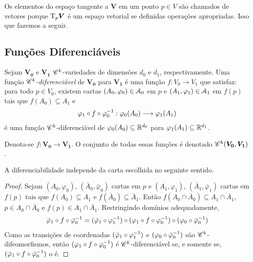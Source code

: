 Os elementos do espaço tangente a $\bm V$ em um ponto $p \in V$ são chamados de vetores porque $\mathrm{T}_p \bm V$ é um espaço vetorial se definidas operações apropriadas. Isso que fazemos a seguir.

\subsection{Funções Diferenciáveis}

\begin{defi}
Sejam $\bm{V_0}$ e $\bm{V_1}$ $\mathscr{C}^k$-variedades de dimensões $d_0$ e $d_1$, respectivamente. Uma função \emph{$\mathscr{C}^k$-diferenciável} de $\bm{V_0}$ para $\bm{V_1}$ é uma função
 $f: V_0 \to V_1$ que satisfaz: para todo $p \in V_0$, existem cartas $(A_0,\varphi_0) \in \mathcal{A}_0$ em $p$ e $(A_1,\varphi_1) \in \mathcal{A}_1$ em $f(p)$ tais que $f(A_0) \subseteq A_1$ e
		\begin{equation*}
		\varphi_1 \circ f \circ \varphi_0^{-1}: \varphi_0(A_0) \longrightarrow \varphi_1(A_1)
		\end{equation*}
é uma função $\mathscr{C}^k$-diferenciável de $\varphi_0(A_0) \subseteq \mathbb{R}^{d_0}$ para $\varphi_1(A_1) \subseteq \mathbb{R}^{d_1}$.

Denota-se $f: \bm{V_0} \to \bm{V_1}$. O conjunto de todas essas funções é denotado $\mathscr{C}^k(\bm{V_0},\bm{V_1})$.
\end{defi}

A diferenciabilidade independe da carta escolhida no seguinte sentido.
\begin{proof}
Sejam $(A_0,\varphi_0)$, $(\bar A_0,\bar\varphi_0)$ cartas em $p$ e $(A_1,\varphi_1)$, $(\bar A_1,\bar\varphi_1)$ cartas em $f(p)$ tais que $f(A_0) \subseteq A_1$ e $f(\bar A_0) \subseteq \bar A_1$. Então $f(A_0 \cap \bar A_0) \subseteq A_1 \cap \bar A_1$, $p \in A_0 \cap \bar A_0$ e $f(p) \in A_1 \cap \bar A_1$. Restringindo domínios adequadamente,
	\begin{equation*}
	\bar \varphi_1 \circ f \circ \bar \varphi_0^{-1} = (\bar \varphi_1 \circ \varphi_1^{-1}) \circ (\varphi_1 \circ f \circ \varphi_0 ^{-1}) \circ (\varphi_0 \circ \bar \varphi_0^{-1})
	\end{equation*}
Como as transições de coordenadas $(\bar \varphi_1 \circ \varphi_1^{-1})$ e $(\varphi_0 \circ \bar \varphi_0^{-1})$ são $\mathscr{C}^k$-difeomorfismos, então $(\varphi_1 \circ f \circ \varphi_0 ^{-1})$ é $\mathscr{C}^k$-diferenciável se, e somente se, $(\bar \varphi_1 \circ f \circ \bar \varphi_0^{-1})$ o é.
\end{proof}

